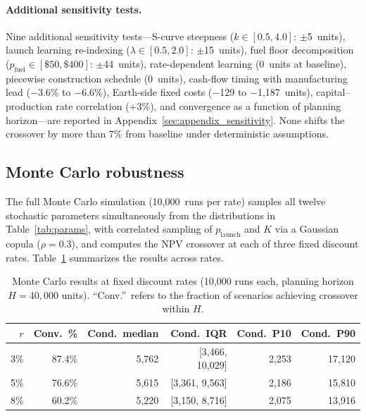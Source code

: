 \documentclass[preprint,12pt]{elsarticle}
\begin{document}
\paragraph{Additional sensitivity tests.} Nine additional sensitivity tests---S-curve steepness ($k \in [0.5, 4.0]$: $\pm$5~units), launch learning re-indexing ($\lambda \in [0.5, 2.0]$: $\pm$15~units), fuel floor decomposition ($p_{\mathrm{fuel}} \in [\$50, \$400]$: $\pm$44~units), rate-dependent learning (0~units at baseline), piecewise construction schedule (0~units), cash-flow timing with manufacturing lead ($-$3.6\% to $-$6.6\%), Earth-side fixed costs ($-$129 to $-$1{,}187~units), capital--production rate correlation ($+$3\%), and convergence as a function of planning horizon---are reported in Appendix~\ref{sec:appendix_sensitivity}. None shifts the crossover by more than 7\% from baseline under deterministic assumptions.

\subsection{Monte Carlo robustness}
\label{sec:mc_robustness}

The full Monte Carlo simulation (10{,}000~runs per rate) samples all twelve stochastic parameters simultaneously from the distributions in Table~\ref{tab:params}, with correlated sampling of $p_{\mathrm{launch}}$ and $K$ via a Gaussian copula ($\rho = 0.3$), and computes the NPV crossover at each of three fixed discount rates. Table~\ref{tab:mc_summary} summarizes the results across rates.

\begin{table}[htbp]
\centering
\caption{Monte Carlo results at fixed discount rates (10{,}000 runs each, planning horizon $H = 40{,}000$ units). ``Conv.''\ refers to the fraction of scenarios achieving crossover within $H$.}
\label{tab:mc_summary}
\small
\begin{tabular}{@{}rrrrrr@{}}
\toprule
$r$ & Conv.\ \% & Cond.\ median & Cond.\ IQR & Cond.\ P10 & Cond.\ P90 \\
\midrule
3\%  & 87.4\% & 5{,}762 & [3{,}466, 10{,}029] & 2{,}253 & 17{,}120 \\
5\%  & 76.6\% & 5{,}615 & [3{,}361, 9{,}563]  & 2{,}186 & 15{,}810 \\
8\%  & 60.2\% & 5{,}220 & [3{,}150, 8{,}716]  & 2{,}075 & 13{,}916 \\
\bottomrule
\end{tabular}
\end{table}
\end{document}
